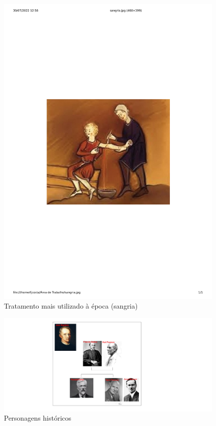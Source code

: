 \documentclass[
]{book}
\begin{document}
\begin{figure}

{\centering \includegraphics[width=0.8\linewidth]{images11/sangria} 

}

\caption{Tratamento mais utilizado à época (sangria)}\label{fig:fig68}
\end{figure}

\hfill\break

\begin{figure}

{\centering \includegraphics[width=0.8\linewidth]{images11/fotos} 

}

\caption{Personagens históricos}\label{fig:fig69}
\end{figure}
\end{document}
